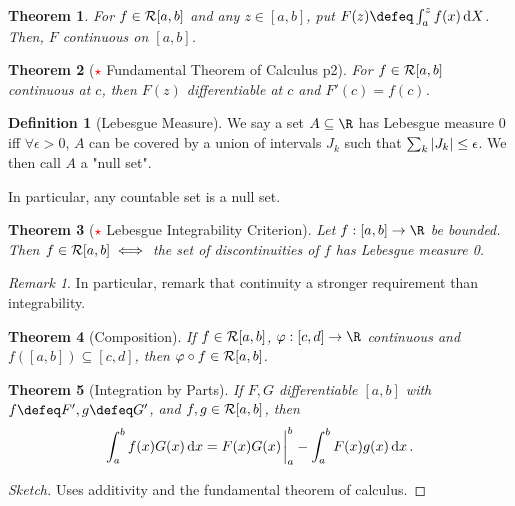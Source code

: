 \documentclass[12pt, oneside]{article}
\theoremstyle{definition}
\newtheorem{defn}{Definition}
\theoremstyle{plain}
\newtheorem{thm}{Theorem}
\theoremstyle{remark}
\newtheorem{remark}{Remark}
\begin{document}
\begin{thm}
  For $f \in \mathcal{R}[a, b]$ and any $z \in [a, b]$, put $F(z) \defeq \int_a^z f(x) \dd{X}$. Then, $F$ continuous on $[a, b]$.
\end{thm}

\begin{thm}[\textcolor{red}{$\star$} Fundamental Theorem of Calculus p2]
  For $f \in \mathcal{R}[a, b]$ continuous at $c$, then $F(z)$ differentiable at $c$ and $F'(c) = f(c)$.
\end{thm}


\begin{defn}[Lebesgue Measure]
  We say a set $A \subseteq \R$ has Lebesgue measure $0$ iff $\forall \epsilon > 0$, $A$ can be covered by a union of intervals $J_k$ such that $\sum_k \abs{J_k} \leq \epsilon$. We then call $A$ a "null set".

  In particular, any countable set is a null set.
\end{defn}

\begin{thm}[\textcolor{red}{$\star$} Lebesgue Integrability Criterion]
  Let $f : [a, b] \to \R$ be bounded. Then $f \in \mathcal{R}[a,b] \iff$ the set of discontinuities of $f$ has Lebesgue measure 0.
\end{thm}

\begin{remark}
  In particular, remark that continuity a stronger requirement than integrability.
\end{remark}

\begin{thm}[Composition]
  If $f \in \mathcal{R}[a, b]$, $\varphi : [c, d] \to \R$ continuous and $f([a, b]) \subseteq [c, d]$, then $\varphi \circ f \in \mathcal{R}[a, b]$.
\end{thm}

\begin{thm}[Integration by Parts]
  If $F, G$ differentiable $[a, b]$ with $f \defeq F', g \defeq G'$, and $f, g \in \mathcal{R}[a, b]$, then \[
  \int_a^b f(x) G(x) \dd{x} = F(x) G(x)\eval_{a}^b - \int_a^b F(x) g(x) \dd{x}.
  \]
\end{thm}

\begin{proof}[Sketch]
  Uses additivity and the fundamental theorem of calculus.
\end{proof}
\end{document}
